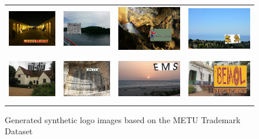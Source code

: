 \begin{figure}
  \centering
  \begin{tabular}{cccc}
    \includegraphics[height=20mm]{images/mt/synmetu1.jpg} &   \includegraphics[height=20mm]{images/mt/synmetu2.jpg}  & \includegraphics[height=20mm]{images/mt/synmetu3.jpg} &   \includegraphics[height=20mm]{images/mt/synmetu4.jpg}\\
    \includegraphics[height=20mm]{images/mt/synmetu5.jpg} &   \includegraphics[height=20mm]{images/mt/synmetu6.jpg}  & \includegraphics[height=20mm]{images/mt/synmetu7.jpg} &   \includegraphics[height=20mm]{images/mt/synmetu8.jpg}
  \end{tabular}
  \caption{Generated synthetic logo images based on the METU Trademark Dataset \cite{DBLP:journals/corr/TursunAK17}}
  \label{f:synmetu}
\end{figure}

